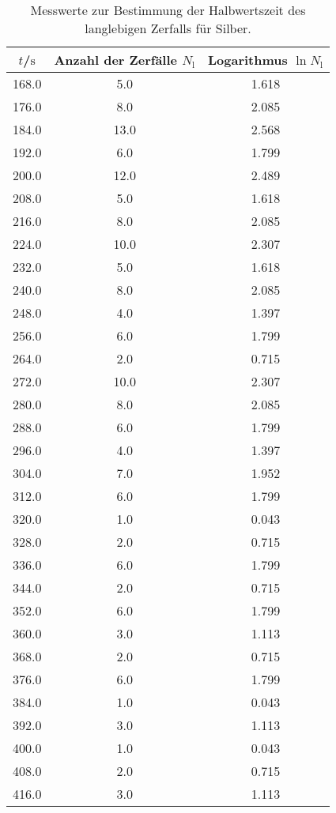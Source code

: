 \begin{table}
	\centering
	\caption{Messwerte zur Bestimmung der Halbwertszeit des langlebigen Zerfalls für Silber.}
	\label{tab:silver2}
	\begin{tabular}{ccc}
		\toprule
		$t$/$\si{\second}$ & Anzahl der Zerfälle $N_\mathrm{l}$ & Logarithmus $\ln{N_\mathrm{l}}$ \\
		\midrule
		168.0 & 5.0 & 1.618 \\
		176.0 & 8.0 & 2.085 \\
		184.0 & 13.0 & 2.568 \\
		192.0 & 6.0 & 1.799 \\
		200.0 & 12.0 & 2.489 \\
		208.0 & 5.0 & 1.618 \\
		216.0 & 8.0 & 2.085 \\
		224.0 & 10.0 & 2.307 \\
		232.0 & 5.0 & 1.618 \\
		240.0 & 8.0 & 2.085 \\
		248.0 & 4.0 & 1.397 \\
		256.0 & 6.0 & 1.799 \\
		264.0 & 2.0 & 0.715 \\
		272.0 & 10.0 & 2.307 \\
		280.0 & 8.0 & 2.085 \\
		288.0 & 6.0 & 1.799 \\
		296.0 & 4.0 & 1.397 \\
		304.0 & 7.0 & 1.952 \\
		312.0 & 6.0 & 1.799 \\
		320.0 & 1.0 & 0.043 \\
		328.0 & 2.0 & 0.715 \\
		336.0 & 6.0 & 1.799 \\
		344.0 & 2.0 & 0.715 \\
		352.0 & 6.0 & 1.799 \\
		360.0 & 3.0 & 1.113 \\
		368.0 & 2.0 & 0.715 \\
		376.0 & 6.0 & 1.799 \\
		384.0 & 1.0 & 0.043 \\
		392.0 & 3.0 & 1.113 \\
		400.0 & 1.0 & 0.043 \\
		408.0 & 2.0 & 0.715 \\
		416.0 & 3.0 & 1.113 \\
		\bottomrule
	\end{tabular}
\end{table}

